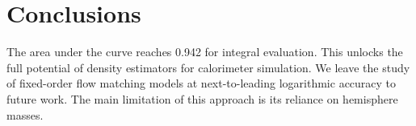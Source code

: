 \section{Conclusions}\label{sec:conclusions}

The area under the curve reaches 0.942 for integral evaluation. This
unlocks the full potential of density estimators for calorimeter
simulation. We leave the study of fixed-order flow matching models at
next-to-leading logarithmic accuracy to future work. The main limitation
of this approach is its reliance on hemisphere masses.

